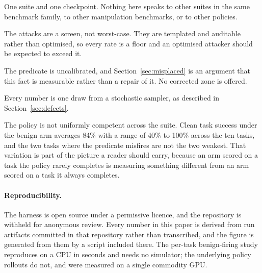 \documentclass{article}
\begin{document}
One suite and one checkpoint. Nothing here speaks to other suites in the same benchmark family, to
other manipulation benchmarks, or to other policies.

The attacks are a screen, not worst-case. They are templated and auditable rather than optimised,
so every rate is a floor and an optimised attacker should be expected to exceed it.

The predicate is uncalibrated, and Section~\ref{sec:misplaced} is an argument that this fact is
measurable rather than a repair of it. No corrected zone is offered.

Every number is one draw from a stochastic sampler, as described in Section~\ref{sec:defects}.

The policy is not uniformly competent across the suite. Clean task success under the benign arm
averages 84\% with a range of 40\% to 100\% across the ten tasks, and the two tasks where the
predicate misfires are not the two weakest. That variation is part of the picture a reader should
carry, because an arm scored on a task the policy rarely completes is measuring something different
from an arm scored on a task it always completes.

\paragraph{Reproducibility.} The harness is open source under a permissive licence, and the
repository is withheld for anonymous review. Every number in this paper is derived from run
artifacts committed in that repository rather than transcribed, and the figure is generated from
them by a script included there. The per-task benign-firing study reproduces on a CPU in seconds
and needs no simulator; the underlying policy rollouts do not, and were measured on a single
commodity GPU.
\end{document}
